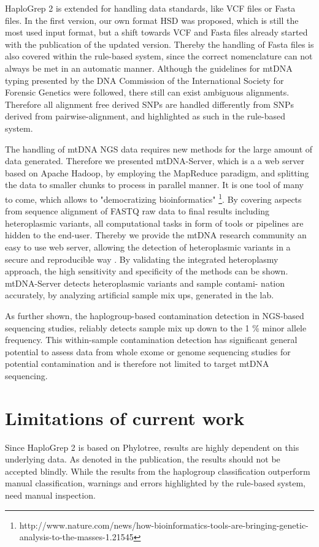HaploGrep 2 is extended for handling data standards, like VCF files or Fasta files. In the first version, our own format HSD was proposed, which is still the most used input format, but a shift towards VCF and Fasta files already started with the publication of the updated version. Thereby the handling of Fasta files is also covered within the rule-based system, since the correct nomenclature can not always be met in an automatic manner.  Although the guidelines for mtDNA typing presented by the DNA Commission of the International Society for Forensic Genetics \cite{Parson2014} were followed, there still can exist ambiguous alignments. Therefore all alignment free derived SNPs are handled differently from SNPs derived from pairwise-alignment, and highlighted as such in the rule-based system.

The handling of mtDNA NGS data requires new methods for the large amount of data generated. Therefore we presented mtDNA-Server, which is a a web server based on Apache Hadoop, by employing the MapReduce paradigm, and splitting the data to smaller chunks to process in parallel manner. It is one tool of many to come, which allows to "democratizing bioinformatics" \footnote{http://www.nature.com/news/how-bioinformatics-tools-are-bringing-genetic-analysis-to-the-masses-1.21545}. By covering aspects from sequence alignment of FASTQ raw data to final results including heteroplasmic variants, all computational tasks in form of tools or pipelines are hidden to the end-user.  Thereby we provide the mtDNA research community an easy to use web server, allowing the detection of heteroplasmic variants in a secure and reproducible way \cite{Weissensteiner2016b}. By validating the integrated heteroplasmy approach, the high sensitivity and specificity of the methods can be shown. mtDNA-Server detects heteroplasmic variants and sample contami- nation accurately, by analyzing artificial sample mix ups, generated in the lab.

As further shown, the haplogroup-based contamination detection in NGS-based sequencing studies, reliably detects sample mix up down to the 1 \% minor allele frequency. 
This within-sample contamination detection has significant general potential to assess data from whole exome or genome sequencing studies for potential contamination and is therefore not limited to target mtDNA sequencing. 

\section{Limitations of current work}
\label{disc:sec2}
Since HaploGrep 2 is based on Phylotree, results are highly dependent on this underlying data. As denoted in the publication, the results should not be accepted blindly. While the results from the haplogroup classification outperform manual classification, warnings and errors highlighted by the rule-based system, need manual inspection. 

